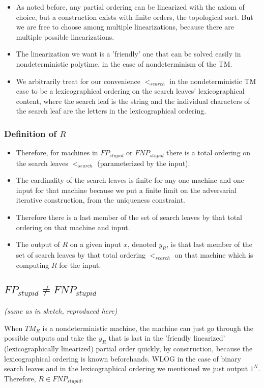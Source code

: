 \documentclass{article}
\begin{document}
\begin{itemize}
\begin{itemize}
        \item As noted before, any partial ordering can be linearized with the axiom of choice, but a construction exists with finite orders, the topological sort. But we are free to choose among multiple linearizations, because there are multiple possible linearizations.
        \item The linearization we want is a 'friendly' one that can be solved easily in nondeterministic polytime, in the case of nondeterminism of the TM.
        \item We arbitrarily treat for our convenience $<_{search}$ in the nondeterministic TM case to be a lexicographical ordering on the search leaves' lexicographical content, where the search leaf is the string and the individual characters of the search leaf are the letters in the lexicographical ordering.
    \end{itemize}
\end{itemize}

\subsubsection{Definition of $R$}

\begin{itemize}
    \item Therefore, for machines in $FP_{stupid}$ or $FNP_{stupid}$ there is a total ordering on the search leaves $<_{search}$ (parameterized by the input).
    \item The cardinality of the search leaves is finite for any one machine and one input for that machine because we put a finite limit on the adversarial iterative construction, from the uniqueness constraint.
    \item Therefore there is a last member of the set of search leaves by that total ordering on that machine and input.
    \item The output of $R$ on a given input $x$, denoted $y_R$, is that last member of the set of search leaves by that total ordering $<_{search}$ on that machine which is computing $R$ for the input.
\end{itemize}

\subsection{$FP_{stupid} \neq FNP_{stupid}$}

\textit{(same as in sketch, reproduced here)}

When $TM_R$ is a nondeterministic machine, the machine can just go through the possible outputs and take the $y_R$ that is last in the 'friendly linearized' (lexicographically linearized) partial order quickly, by construction, because the lexicographical ordering is known beforehands. WLOG in the case of binary search leaves and in the lexicographical ordering we mentioned we just output $1^N$. Therefore, $R \in FNP_{stupid}$.
\end{document}
